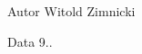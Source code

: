 \begin{DoxyAuthor}{Autor}
Witold Zimnicki 
\end{DoxyAuthor}
\begin{DoxyDate}{Data}
9.. 
\end{DoxyDate}
